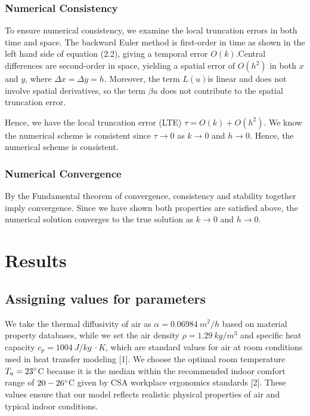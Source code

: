 \documentclass{article}
\begin{document}
\subsubsection*{Numerical Consistency}
\noindent To ensure numerical consistency, we examine the local truncation errors in both time and space. The backward Euler method is first-order in time as shown in the left hand side of equation (2.2), giving a temporal error $O(k)$.Central differences are second-order in space, yielding a spatial error of $O(h^2)$ in both $x$ and $y$, where $\Delta x = \Delta y = h$. Moreover, the term $L(u)$is linear and does not involve spatial derivatives, so the term $\beta u$ does not contribute to the spatial truncation error.

\vspace{3mm}

\noindent Hence, we have the local truncation error (LTE) $\tau = O(k) + O(h^2)$. We know the numerical scheme is consistent since $\tau \rightarrow0$ as $k\rightarrow0$ and $h\rightarrow0$. Hence, the numerical scheme is consistent.

\subsubsection*{Numerical Convergence}
By the Fundamental theorem of convergence, consistency and stability together imply convergence. Since we have shown both properties are satisfied above, the numerical solution converges to the true solution as $k\rightarrow0$ and $h\rightarrow0$.


\section{Results}\label{sec:Results}

\subsection{Assigning values for parameters}
\noindent We take the thermal diffusivity of air as $\alpha = 0.06984\ m^2/h$ based on material property databases, while we set the air density $\rho = 1.29\ kg/m^3$ and specific heat capacity $c_p = 1004\ J/kg\ \cdotp K$, which are standard values for air at room conditions used in heat transfer modeling [1]. We choose the optimal room temperature $T_a = 23 \degree$C because it is the median within the recommended indoor comfort range of $20-26 \degree$C given by CSA workplace ergonomics standards [2]. These values ensure that our model reflects realistic physical properties of air and typical indoor conditions.
\end{document}
